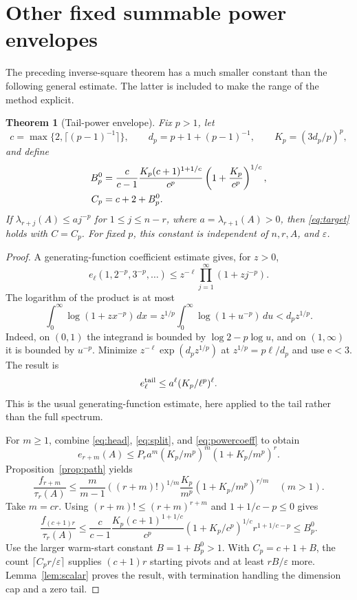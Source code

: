 \documentclass[11pt]{article}
\newtheorem{theorem}{Theorem}[section]
\theoremstyle{remark}\newtheorem{remark}[theorem]{Remark}
\newcommand{\eps}{\varepsilon}
\begin{document}
\section{Other fixed summable power envelopes}
The preceding inverse-square theorem has a much smaller constant than the following general estimate. The latter is included to make the range of the method explicit.

\begin{theorem}[Tail-power envelope]\label{thm:power}
Fix $p>1$, let
\[
 c=\max\{2,\lceil(p-1)^{-1}\rceil\},\qquad
 d_p=p+1+(p-1)^{-1},\qquad K_p=(3d_p/p)^p,
\]
and define
\begin{align}
 B_p^0&=\frac{c}{c-1}\frac{K_p(c+1)^{1+1/c}}{c^p}
             \left(1+\frac{K_p}{c^p}\right)^{1/c},\notag\\
 C_p&=c+2+B_p^0. \label{eq:Cp}
\end{align}
If $\lambda_{r+j}(A)\le a j^{-p}$ for $1\le j\le n-r$, where $a=\lambda_{r+1}(A)>0$, then \eqref{eq:target} holds with $C=C_p$. For fixed $p$, this constant is independent of $n,r,A$, and $\eps$.
\end{theorem}
\begin{proof}
A generating-function coefficient estimate gives, for $z>0$,
\[
 e_\ell(1,2^{-p},3^{-p},\ldots)
 \le z^{-\ell}\prod_{j=1}^\infty(1+zj^{-p}).
\]
The logarithm of the product is at most
\[
 \int_0^\infty\log(1+zx^{-p})\,dx
 =z^{1/p}\int_0^\infty\log(1+u^{-p})\,du
 <d_p z^{1/p}.
\]
Indeed, on $(0,1)$ the integrand is bounded by $\log2-p\log u$, and on $(1,\infty)$ it is bounded by $u^{-p}$. Minimize $z^{-\ell}\exp(d_pz^{1/p})$ at $z^{1/p}=p\ell/d_p$ and use $\mathrm e<3$. The result is
\begin{equation}
 e_\ell^{\rm tail}\le a^\ell(K_p/\ell^p)^\ell. \label{eq:powercoeff}
\end{equation}
This is the usual generating-function estimate, here applied to the tail rather than the full spectrum.

For $m\ge1$, combine \eqref{eq:head}, \eqref{eq:split}, and \eqref{eq:powercoeff} to obtain
\[
 e_{r+m}(A)\le P_r a^m(K_p/m^p)^m(1+K_p/m^p)^r.
\]
Proposition~\ref{prop:path} yields
\begin{equation}
 \frac{f_{r+m}}{\tau_r(A)}\le
 \frac{m}{m-1}((r+m)!)^{1/m}\frac{K_p}{m^p}
 (1+K_p/m^p)^{r/m}\quad(m>1). \label{eq:powermean}
\end{equation}
Take $m=cr$. Using $(r+m)!\le(r+m)^{r+m}$ and $1+1/c-p\le0$ gives
\[
 \frac{f_{(c+1)r}}{\tau_r(A)}\le
 \frac{c}{c-1}\frac{K_p(c+1)^{1+1/c}}{c^p}
 (1+K_p/c^p)^{1/c}r^{1+1/c-p}\le B_p^0.
\]
Use the larger warm-start constant $B=1+B_p^0>1$. With $C_p=c+1+B$, the count $\lceil C_pr/\eps\rceil$ supplies $(c+1)r$ starting pivots and at least $rB/\eps$ more. Lemma~\ref{lem:scalar} proves the result, with termination handling the dimension cap and a zero tail.
\end{proof}
\end{document}
